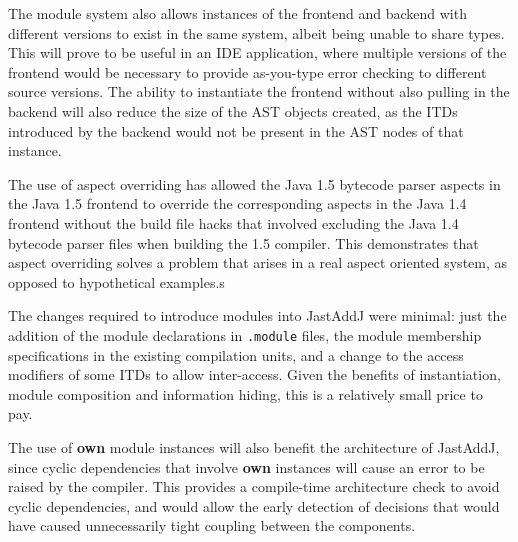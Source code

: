 The module system also allows instances of the frontend and backend with different versions
to exist in the same system, albeit being unable to share types. This will prove to be useful
in an IDE application, where multiple versions of the frontend would be necessary to provide
as-you-type error checking to different source versions. The ability to instantiate the frontend
without also pulling in the backend will also reduce the size of the AST objects created, as the
ITDs introduced by the backend would not be present in the AST nodes of that instance.

The use of aspect overriding has allowed the Java 1.5 bytecode parser aspects in the Java 1.5 frontend to
override the corresponding aspects in the Java 1.4 frontend without the build file hacks that involved
excluding the Java 1.4 bytecode parser files when building the 1.5 compiler. This demonstrates that
aspect overriding solves a problem that arises in a real aspect oriented system, as opposed to 
hypothetical examples.s


The changes required to introduce modules into JastAddJ were minimal: just the addition of the module 
declarations in \texttt{.module} files, the module membership specifications in the existing compilation units,
and a change to the access modifiers of some ITDs to allow inter-access. Given the benefits of instantiation, 
module composition and information hiding, this is a relatively small price to pay.

The use of \textbf{own} module instances will also benefit the architecture of JastAddJ,
since cyclic dependencies that involve \textbf{own} instances will cause an error to
be raised by the compiler. This provides a compile-time architecture check to avoid cyclic dependencies,
and would allow the early detection of decisions that would have caused unnecessarily
tight coupling between the components.





 
 

